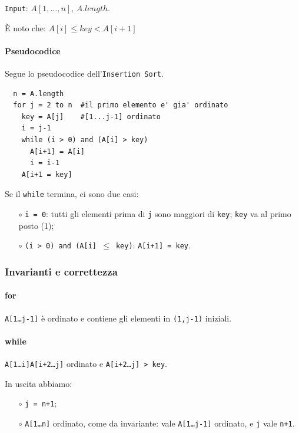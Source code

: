 \bigskip

\texttt{Input}: $A[1, \dots ,n]$, $A.length$.

\begin{center}
	È noto che: 
	$A[i] \leq key < A[i+1]$
\end{center}

\paragraph{Pseudocodice} Segue lo pseudocodice dell'\texttt{Insertion Sort}.

\begin{lstlisting}
  n = A.length
  for j = 2 to n  #il primo elemento e' gia' ordinato
    key = A[j]    #[1...j-1] ordinato
    i = j-1
    while (i > 0) and (A[i] > key)
      A[i+1] = A[i]
      i = i-1
    A[i+1 = key]
\end{lstlisting}

\vspace{0.5cm}

Se il \texttt{while} termina, ci sono due casi: 
\begin{itemize}
	\item[$\circ$] \texttt{i = 0}: tutti gli elementi prima di \texttt{j} 
	sono maggiori di \texttt{key}; \texttt{key} va al primo posto (1);
	\item[$\circ$] \texttt{(i > 0) and (A[i] $\leq$ key)}: \texttt{A[i+1] = key}.
\end{itemize}

\subsubsection{Invarianti e correttezza}

\paragraph{for} \texttt{A[1\dots j-1]} è ordinato e contiene gli 
elementi in \texttt{(1,j-1)} iniziali.

\paragraph{while} \texttt{A[1\dots i]A[i+2\dots j]} ordinato e 
\texttt{A[i+2\dots j] > key}. \par
\vspace{0.5cm}
In uscita abbiamo: 
\begin{itemize}[noitemsep]
	\item[$\circ$] \texttt{j = n+1}; \par
	\item[$\circ$] \texttt{A[1\dots n]} ordinato, come da invariante: 
	vale \texttt{A[1\dots j-1]}	ordinato, e \texttt{j} vale \texttt{n+1}.
\end{itemize}